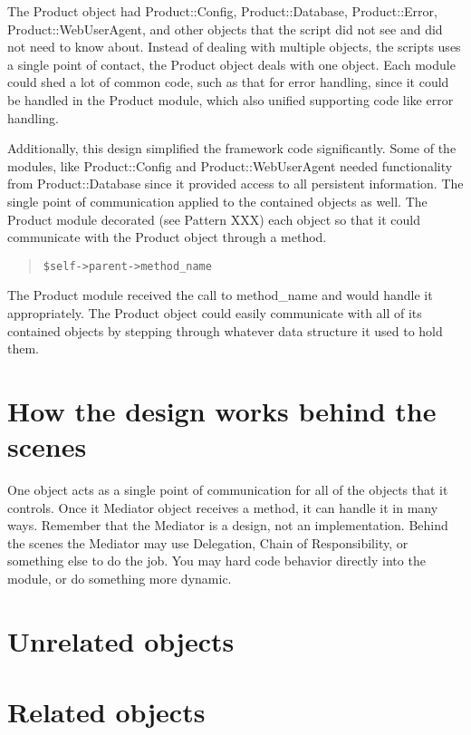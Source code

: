The Product object had Product::Config, Product::Database,
Product::Error, Product::WebUserAgent, and other objects that the script
did not see and did not need to know about. Instead of dealing with
multiple objects, the scripts uses a single point of contact, the
Product object deals with one object.  Each module could shed a lot of
common code, such as that for error handling, since it could be handled
in the Product module, which also unified supporting code like error
handling.

Additionally, this design simplified the framework code significantly.
Some of the modules, like Product::Config and Product::WebUserAgent
needed functionality from Product::Database since it provided access
to all persistent information.  The single point of communication applied
to the contained objects as well.  The Product module decorated (see 
Pattern XXX) each object so that it could communicate with the Product
object through a method.

\begin{quote}
\begin{verbatim}
$self->parent->method_name
\end{verbatim}
\end{quote}

The Product module received the call to method\_name and would handle
it appropriately.  The Product object could easily communicate with
all of its contained objects by stepping through whatever data
structure it used to hold them.

    \section{How the design works behind the scenes}

One object acts as a single point of communication for all of the objects 
that it controls.  Once it Mediator object receives a method, it can handle
it in many ways.  Remember that the Mediator is a design, not an implementation.
Behind the scenes the Mediator may use Delegation, Chain of Responsibility,
or something else to do the job.  You may hard code behavior directly into
the module, or do something more dynamic.

	\section{Unrelated objects}
	
	
	\section{Related objects}
	
